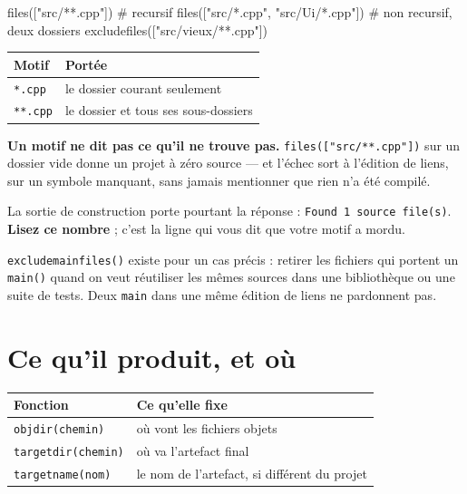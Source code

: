 \begin{nkcode}{}
files(["src/**.cpp"])                        # recursif
files(["src/*.cpp", "src/Ui/*.cpp"])         # non recursif, deux dossiers
excludefiles(["src/vieux/**.cpp"])
\end{nkcode}

\begin{center}
\begin{tabular}{@{}ll@{}}
\toprule
\textbf{Motif} & \textbf{Portée} \\
\midrule
\texttt{*.cpp} & le dossier courant seulement \\
\texttt{**.cpp} & le dossier et tous ses sous-dossiers \\
\bottomrule
\end{tabular}
\end{center}

\begin{nkpiege}
\textbf{Un motif ne dit pas ce qu'il ne trouve pas.} \texttt{files(["src/**.cpp"])}
sur un dossier vide donne un projet à zéro source --- et l'échec sort à l'édition
de liens, sur un symbole manquant, sans jamais mentionner que rien n'a été
compilé.

La sortie de construction porte pourtant la réponse :
\texttt{Found 1 source file(s)}. \textbf{Lisez ce nombre} ; c'est la ligne qui
vous dit que votre motif a mordu.
\end{nkpiege}

\begin{nkretenir}
\texttt{excludemainfiles()} existe pour un cas précis : retirer les fichiers qui
portent un \texttt{main()} quand on veut réutiliser les mêmes sources dans une
bibliothèque ou une suite de tests. Deux \texttt{main} dans une même édition de
liens ne pardonnent pas.
\end{nkretenir}

\section{Ce qu'il produit, et où}

\begin{center}
\begin{tabular}{@{}ll@{}}
\toprule
\textbf{Fonction} & \textbf{Ce qu'elle fixe} \\
\midrule
\texttt{objdir(chemin)} & où vont les fichiers objets \\
\texttt{targetdir(chemin)} & où va l'artefact final \\
\texttt{targetname(nom)} & le nom de l'artefact, si différent du projet \\
\bottomrule
\end{tabular}
\end{center}

